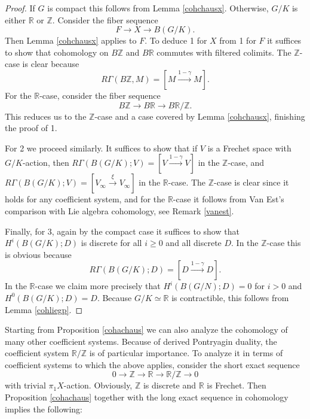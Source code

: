 \documentclass[12pt]{article}
\theoremstyle{definition}
\newcommand{\mbb}{\mathbb}
\begin{document}
\begin{proof}
If $G$ is compact this follows from Lemma \ref{cohchausx}.  Otherwise, $G/K$ is either $\mbb{R}$ or $\mbb{Z}$.  Consider the fiber sequence
$$F \to X \to B(G/K).$$
Then Lemma \ref{cohchausx} applies to $F$.  To deduce 1 for $X$ from 1 for $F$ it suffices to show that cohomology on $B\mbb{Z}$ and $B\mbb{R}$ commutes with filtered colimits.  The $\mbb{Z}$-case is clear because
$$R\Gamma(B\mbb{Z},M) = [M \overset{1-\gamma}{\longrightarrow} M].$$
For the $\mbb{R}$-case, consider the fiber sequence
$$B\mbb{Z} \to B\mbb{R} \to B\mbb{R}/\mbb{Z}.$$
This reduces us to the $\mbb{Z}$-case and a case covered by Lemma \ref{cohchausx}, finishing the proof of 1.

For 2 we proceed similarly.  It suffices to show that if $V$ is a Frechet space with $G/K$-action, then $R\Gamma(B(G/K);V) = [V \overset{1-\gamma}{\longrightarrow} V]$
in the $\mbb{Z}$-case, and $R\Gamma(B(G/K);V) = [V_\infty\overset{\xi}{\longrightarrow} V_\infty]$ in the $\mbb{R}$-case.  The $\mbb{Z}$-case is clear since it holds for any coefficient system, and for the $\mbb{R}$-case it follows from Van Est's comparison with Lie algebra cohomology, see Remark \ref{vanest}.

Finally, for 3, again by the compact case it suffices to show that $H^i(B(G/K);D)$ is discrete for all $i\geq 0$ and all discrete $D$.  In the $\mbb{Z}$-case this is obvious because
$$R\Gamma(B(G/K);D) = [D \overset{1-\gamma}{\longrightarrow}D].$$
In the $\mbb{R}$-case we claim more precisely that $H^i(B(G/N);D)=0$ for $i>0$ and $H^0(B(G/K);D)=D$.  Because $G/K\simeq \mbb{R}$ is contractible, this follows from Lemma \ref{cohliegp}.
\end{proof}

Starting from Proposition \ref{cohachaus} we can also analyze the cohomology of many other coefficient systems.  Because of derived Pontryagin duality, the coefficient system $\mbb{R}/\mbb{Z}$ is of particular importance.  To analyze it in terms of coefficient systems to which the above applies, consider the short exact sequence
$$0 \to \mbb{Z} \to \mbb{R} \to \mbb{R}/\mbb{Z} \to 0$$
with trivial $\pi_1X$-action.  Obviously, $\mbb{Z}$ is discrete and $\mbb{R}$ is Frechet.  Then Proposition \ref{cohachaus} together with the long exact sequence in cohomology implies the following:
\end{document}
